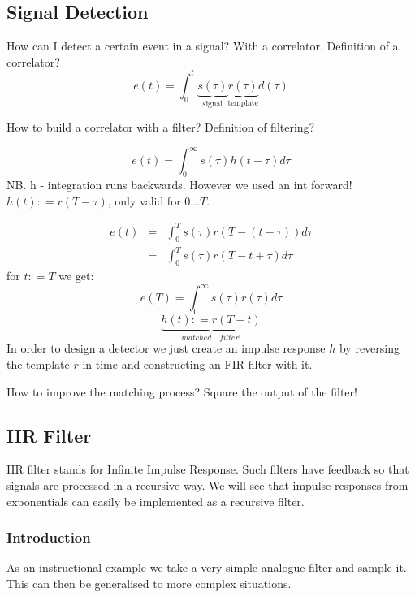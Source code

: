 \documentclass[12pt,a4paper]{article}
\begin{document}
\subsection{Signal Detection}
How can I detect a certain event in a signal? With a correlator.
Definition of a correlator?
\begin{equation}
e(t) = \int_{0}^{t} \underbrace{s(\tau)}_{\mbox{signal}} \underbrace{r(\tau)}_{\mbox{template}} d(\tau)
\end{equation}

How to build a correlator with a filter? Definition of filtering?

\begin{equation}
e(t) = \int_{0}^{\infty} s(\tau) h(t - \tau) d\tau 
\end{equation}
NB. h - integration runs backwards.  However we used an int forward!
$h(t) : = r(T - \tau)$, only valid for $0\ldots T$.

\begin{eqnarray} 
e(t) & = & \int_{0}^{T} s(\tau) r \left(T - (t - \tau)\right) d\tau \\
     & = & \int_{0}^{T} s(\tau) r(T - t + \tau) d\tau 
\end{eqnarray}
for $t: = T$ we get:
\begin{equation}
e(T) = \int_{0}^{\infty} s(\tau) r (\tau) d\tau
\end{equation}
\begin{equation}
\underbrace{h(t) : = r(T - t)}_{ matched \quad  filter!} 
\end{equation}
In order to design a detector we just create an impulse
response $h$ by reversing the template $r$ in time and
constructing an FIR filter with it.

How to improve the matching process? Square the output of the filter!


\clearpage
\subsection{IIR Filter}
IIR filter stands for Infinite Impulse Response. Such filters have
feedback so that signals are processed in a recursive way. We will see
that impulse responses from exponentials can easily be implemented as
a recursive filter.

\subsubsection{Introduction}
As an instructional example we take a very simple analogue filter and
sample it. This can then be generalised to more complex
situations.
\end{document}
